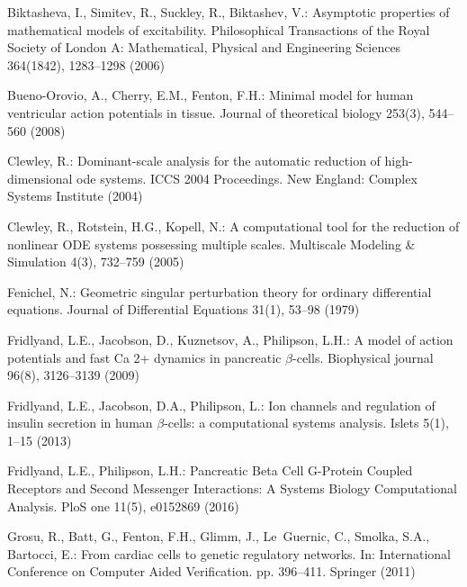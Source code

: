 \documentclass{llncs}
\begin{document}
\begin{thebibliography}{10}
\providecommand{\url}[1]{\texttt{#1}}
\providecommand{\urlprefix}{URL }

Biktasheva, I., Simitev, R., Suckley, R., Biktashev, V.: Asymptotic properties
  of mathematical models of excitability. Philosophical Transactions of the
  Royal Society of London A: Mathematical, Physical and Engineering Sciences
  364(1842),  1283--1298 (2006)

Bueno-Orovio, A., Cherry, E.M., Fenton, F.H.: Minimal model for human
  ventricular action potentials in tissue. Journal of theoretical biology
  253(3),  544--560 (2008)

Clewley, R.: Dominant-scale analysis for the automatic reduction of
  high-dimensional ode systems. ICCS 2004 Proceedings. New England: Complex
  Systems Institute  (2004)

Clewley, R., Rotstein, H.G., Kopell, N.: {A computational tool for the
  reduction of nonlinear ODE systems possessing multiple scales}. Multiscale
  Modeling \& Simulation  4(3),  732--759 (2005)

Fenichel, N.: Geometric singular perturbation theory for ordinary differential
  equations. Journal of Differential Equations  31(1),  53--98 (1979)

Fridlyand, L.E., Jacobson, D., Kuznetsov, A., Philipson, L.H.: {A model of
  action potentials and fast Ca 2+ dynamics in pancreatic $\beta$-cells}.
  Biophysical journal  96(8),  3126--3139 (2009)

Fridlyand, L.E., Jacobson, D.A., Philipson, L.: {Ion channels and regulation of
  insulin secretion in human $\beta$-cells: a computational systems analysis}.
  Islets  5(1),  1--15 (2013)

Fridlyand, L.E., Philipson, L.H.: {Pancreatic Beta Cell G-Protein Coupled
  Receptors and Second Messenger Interactions: A Systems Biology Computational
  Analysis}. PloS one  11(5),  e0152869 (2016)

Grosu, R., Batt, G., Fenton, F.H., Glimm, J., Le~Guernic, C., Smolka, S.A.,
  Bartocci, E.: From cardiac cells to genetic regulatory networks. In:
  International Conference on Computer Aided Verification. pp. 396--411.
  Springer (2011)


\end{thebibliography}
\end{document}
